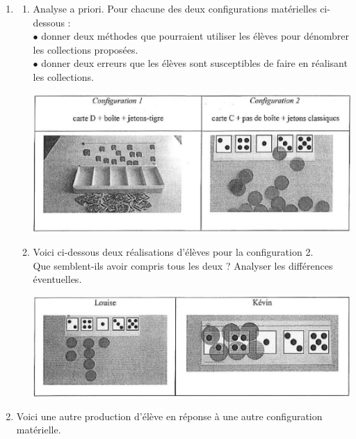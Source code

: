 \begin{exercice}[CRPE 2016 G1]
\begin{enumerate}
   \item 
   \begin{enumerate}
      \item Analyse a priori. Pour chacune des deux configurations matérielles ci-dessous : \\
      $\bullet$ donner deux méthodes que pourraient utiliser les élèves pour dénombrer les collections proposées. \\
      $\bullet$ donner deux erreurs que les élèves sont susceptibles de faire en réalisant les collections.
      \smallskip
      \begin{center}
          \includegraphics[width=16cm]{Nombres_et_calculs_did/Images/Num1_analyse_boite3}
      \end{center}   
      \item Voici ci-dessous deux réalisations d'élèves pour la configuration 2. \\   
      Que semblent-ils avoir compris tous les deux ? Analyser les différences éventuelles.
      \smallskip
      \begin{center}
         \includegraphics[width=16cm]{Nombres_et_calculs_did/Images/Num1_analyse_boite4}
      \end{center}
    \end{enumerate}
    \item Voici une autre production d'élève en réponse à une autre configuration matérielle.
    \smallskip
    \begin{center}

\end{center}
\end{enumerate}
\end{exercice}
